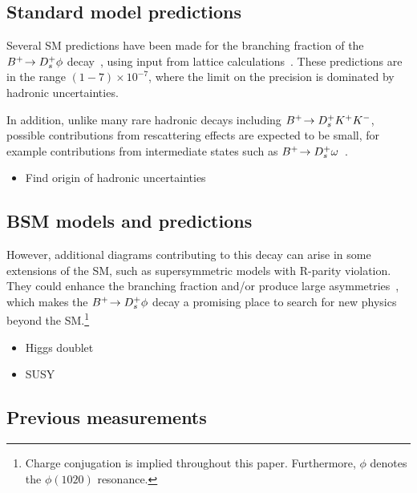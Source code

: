 \subsection{Standard model predictions}
{\color{Blue}
Several SM predictions have been made for the branching fraction of the ${{{B}^+}}\!\rightarrow {\ensuremath{{D}^+_{s}}}\phi$ decay~\cite{Zou:2009zza, Mohanta:2002wf, Mohanta:2007uu, Lu:2001yz}, using input from lattice calculations~\cite{fB:2013HPQCD,fB:2016ETM, fB:2016Fermi}. These predictions are in the range $(1-7)\times10^{-7}$, where the limit on the precision is dominated by hadronic uncertainties. 

In addition, unlike many rare hadronic decays including ${{{B}^+}}\!\rightarrow {\ensuremath{{D}^+_{s}}}{\ensuremath{{K}^+}}{\ensuremath{{K}^-}}$, possible contributions from rescattering effects are expected to be small, for example contributions from intermediate states such as ${{{B}^+}}\!\rightarrow {\ensuremath{{D}^+_{s}}}\omega$~\cite{Gronau:2012gs}.

}

{\color{Red}
\begin{itemize}
\item Find origin of hadronic uncertainties 
\end{itemize}}

\subsection{BSM models and predictions}
{\color{Blue}
However, additional diagrams contributing to this decay can arise in some extensions of the SM, such as supersymmetric models with R-parity 
violation. They could enhance the branching fraction and/or produce large \CP asymmetries~\cite{Mohanta:2002wf, Mohanta:2007uu}, which makes the ${{{B}^+}}\!\rightarrow {\ensuremath{{D}^+_{s}}}\phi$ decay a promising place to search for new physics beyond the SM.\footnote{Charge conjugation is implied throughout this paper. Furthermore, $\phi$ denotes the $\phi(1020)$ resonance.}
}

{\color{Red}
\begin{itemize}
\item Higgs doublet
\item SUSY 
\end{itemize}}

\subsection{Previous measurements}


